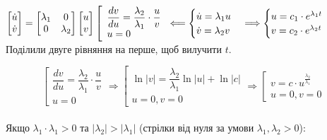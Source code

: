 \documentclass[14pt,a4paper]{scrartcl}
\theoremstyle{definition}
\theoremstyle{definition}
\theoremstyle{definition}
\begin{document}
\begin{spacing}{2}
 $
\begin{bmatrix}
\dot{u}\\
\dot{v}
\end{bmatrix} = \begin{bmatrix}
 \lambda_1 & 0 \\
 0 & \lambda_2
\end{bmatrix} \begin{bmatrix}
 u \\
 v
\end{bmatrix}
\left[ \begin{array}{l}
    \dfrac{dv}{du} = \dfrac{\lambda_2}{\lambda_1} \cdot \dfrac{u}{v}\\
    u = 0
\end{array} \right.
\Longleftarrow
\begin{cases}
    \dot{u} = \lambda_1 u \\
    \dot{v} = \lambda_2 v
\end{cases} \Longrightarrow
\begin{cases}
    u = c_1 \cdot e^{\lambda_1 t}\\
    v = c_2 \cdot e^{\lambda_2 t}
\end{cases} \\
$
\\ Поділили двуге рівняння на перше, щоб вилучити $t$.
\end{spacing}
$$
\left[ \begin{array}{l}
    \dfrac{dv}{du} = \dfrac{\lambda_2}{\lambda_1} \cdot \dfrac{u}{v}\\
    u = 0
\end{array} \right. \Longrightarrow \left[ \begin{array}{l}
    \ln{ \left| v \right| } = \dfrac{\lambda_2}{\lambda_1} \ln{ \left| u \right| } + \ln{ \left| c \right| } \\
    u = 0, v = 0
\end{array} \right. \Longrightarrow
\left[ \begin{array}{l}
    v = c  \cdot u^{ \frac{\lambda_2}{\lambda_1} }\\
    u = 0, v = 0
\end{array} \right.
$$
\\
Якщо $ \lambda_1 \cdot \lambda_1 > 0 $ та $ \left| \lambda_2 \right| > \left| \lambda_1 \right|  $ (стрілки від нуля за умови $
 \lambda_1, \lambda_2 > 0$):
\end{document}

